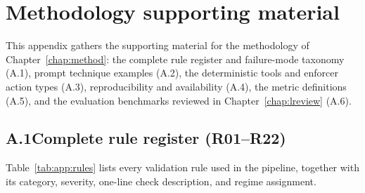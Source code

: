
\chapter{Methodology supporting material} \label{app:rules}

This appendix gathers the supporting material for the methodology of Chapter~\ref{chap:method}: the complete rule register and failure-mode taxonomy (A.1), prompt technique examples (A.2), the deterministic tools and enforcer action types (A.3), reproducibility and availability (A.4), the metric definitions (A.5), and the evaluation benchmarks reviewed in Chapter~\ref{chap:lreview} (A.6).

\section*{A.1\quad Complete rule register (R01--R22)}

Table~\ref{tab:app:rules} lists every validation rule used in the pipeline, together with its category, severity, one-line check description, and regime assignment.

